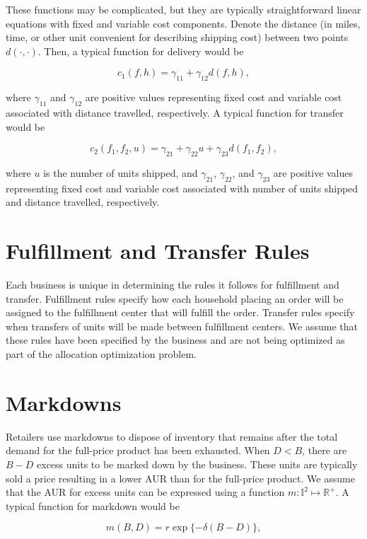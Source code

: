 \documentclass[11pt, oneside]{article}   	%
\begin{document}
These functions may be complicated, but they are typically straightforward linear equations with fixed and variable cost components.  Denote the distance (in miles, time, or other unit convenient for describing shipping cost) between two points $d(\cdot, \cdot)$.  Then, a typical function for delivery would be

$$c_1 (f, h) = \gamma_{11} + \gamma_{12} d(f, h),$$

\noindent where $\gamma_{11}$ and $\gamma_{12}$ are positive values representing fixed cost and variable cost associated with distance travelled, respectively.  A typical function for transfer would be

$$c_2 (f_1, f_2, u) = \gamma_{21} + \gamma_{22} u + \gamma_{23} d(f_1, f_2),$$

\noindent where $u$ is the number of units shipped, and $\gamma_{21}$, $\gamma_{22}$, and $\gamma_{23}$ are positive values representing fixed cost and variable cost associated with number of units shipped and distance travelled, respectively.

\section{Fulfillment and Transfer Rules}

Each business is unique in determining the rules it follows for fulfillment and transfer.  Fulfillment rules specify how each household placing an order will be assigned to the fulfillment center that will fulfill the order.  Transfer rules specify when transfers of units will be made between fulfillment centers.  We assume that these rules have been specified by the business and are not being optimized as part of the allocation optimization problem.

\section{Markdowns}

Retailers use markdowns to dispose of inventory that remains after the total demand for the full-price product has been exhausted.  When $D < B$, there are $B - D$ excess units to be marked down by the business.  These units are typically sold a price resulting in a lower AUR than for the full-price product.  We assume that the AUR for excess units can be expressed using a function $m \colon \mathbb{I}^2 \mapsto \mathbb{R}^+$.  A typical function for markdown would be

$$m (B, D) = r \exp \{- \delta (B - D) \},$$
\end{document}

